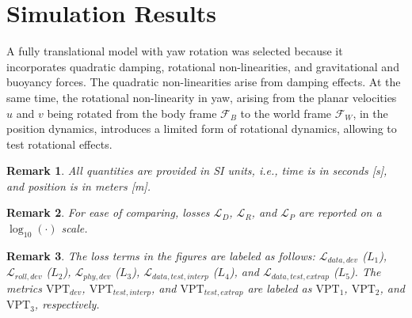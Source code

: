\documentclass[conference]{IEEEtran}
\newtheorem{remark}{Remark}
\begin{document}
{%

\section{Simulation Results} %
\label{sec:results}
A fully translational model with yaw rotation was selected because it incorporates quadratic damping, rotational non-linearities, and gravitational and buoyancy forces. The quadratic non-linearities arise from damping effects. At the same time, the rotational non-linearity in yaw, arising from the planar velocities $u$ and $v$ being rotated from the body frame $\mathcal{F}_B$ to the world frame $\mathcal{F}_W$, in the position dynamics, introduces a limited form of rotational dynamics, allowing to test rotational effects.



\begin{remark}
All quantities are provided in SI units, i.e., time is in seconds [s], and position is in meters [m].
\end{remark}

\begin{remark}
For ease of comparing, losses $\mathcal{L}_D$, $\mathcal{L}_R$, and $\mathcal{L}_P$ are reported on a $\log_{10}(\cdot)$ scale.
\end{remark}


\begin{remark}
The loss terms in the figures are labeled as follows: $\mathcal{L}_{data,dev}$ ($L_1$), $\mathcal{L}_{roll,dev}$ ($L_2$), $\mathcal{L}_{phy,dev}$ ($L_3$), $\mathcal{L}_{data,test,interp}$ ($L_4$), and $\mathcal{L}_{data,test,extrap}$ ($L_5$). The metrics $\text{VPT}_{dev}$, $\text{VPT}_{test,interp}$, and $\text{VPT}_{test,extrap}$ are labeled as $\text{VPT}_1$, $\text{VPT}_2$, and $\text{VPT}_3$, respectively.
\end{remark}





}
\end{document}
